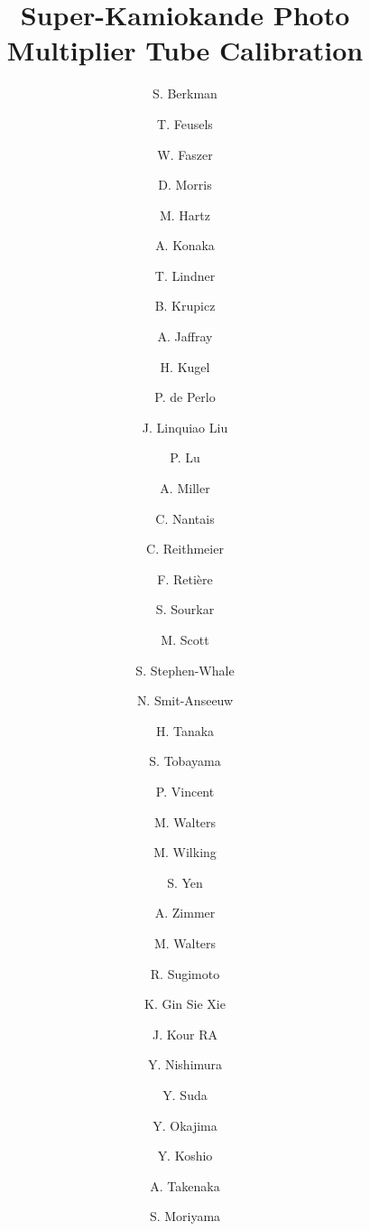 \begin{frontmatter}


\title{Super-Kamiokande Photo Multiplier Tube Calibration}


\author[ins:ubc,ins:triu]{S. Berkman}
\author[ins:ubc,ins:triu]{T. Feusels}
\cortext[cor1]{}
\author[ins:triu]{W. Faszer}
\author[ins:triu]{D. Morris}
\author[ins:triu,ins:kav]{M. Hartz}
\author[ins:triu]{A. Konaka}
\author[ins:triu]{T. Lindner}
\author[]{B. Krupicz}
\author[]{A. Jaffray}
\author[]{H. Kugel}
\author[]{P. de Perlo}
\author[]{J. Linquiao Liu}
\author[]{P. Lu}
\author[ins:triu]{A. Miller}
\author[]{C. Nantais}
\author[]{C. Reithmeier}
\author[ins:triu]{F. Reti\`ere}
\author[]{S. Sourkar}
\author[ins:triu]{M. Scott}
\author[]{S. Stephen-Whale}
\author[]{N. Smit-Anseeuw}
\author[]{H. Tanaka}
\author[ins:ubc,ins:triu]{S. Tobayama}
\author[ins:triu]{P. Vincent}
\author[]{M. Walters}
\author[]{M. Wilking}
\author[ins:triu]{S. Yen}
\author[]{A. Zimmer}
\author[]{M. Walters}
\author[]{R. Sugimoto}
\author[]{K. Gin Sie Xie}
\author[]{J. Kour RA}
\author[ins:kash]{Y. Nishimura}
\author[ins:toky]{Y. Suda}
\author[ins:toky2]{Y. Okajima}
\author[ins:okaj,ins:kav]{Y. Koshio}
\author[ins:kamio,ins:oxf]{A. Takenaka}
\author[ins:kamio,ins:oxf]{S. Moriyama}


\address[ins:ubc]{University of British Columbia, Department of Physics and Astronomy, Vancouver, British Columbia, Canada}
\address[ins:triu]{TRIUMF, Vancouver, British Columbia, Canada}
\address[ins:kav]{Kavli Institute for the Physics and Mathematics of the Universe (WPI), The University
of Tokyo Institutes for Advanced Study, University of Tokyo, Kashiwa, Chiba, Japan}
\address[ins:kash]{Research Center for Cosmic Neutrinos, Institute for Cosmic Ray
Research, University of Tokyo, Kashiwa, Chiba 277-8582, Japan}
\address[ins:toky]{Department of Physics, University of Tokyo, Bunkyo, Tokyo 113-0033, Japan}
\address[ins:toky2]{Department of Physics, Tokyo Institute of Technology, Meguro, Tokyo 152-8551, Japan}
\address[ins:okaj]{Department of Physics, Okayama University, Okayama, Okayama 700-8530, Japan}
\address[ins:kamio]{Kamioka Observatory, Institute for Cosmic Ray Research, University of Tokyo, Kamioka, Gifu 506-1205, Japan}
\address[ins:oxf]{STFC, Rutherford Appleton Laboratory, Harwell Oxford, and Daresbury Laboratory, Warrington, OX11 0QX, United Kingdom}


\end{frontmatter}
